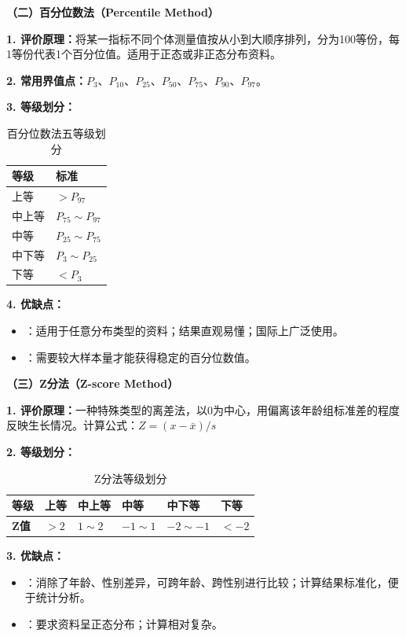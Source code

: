 \begin{keybox}
\textbf{（二）百分位数法（Percentile Method）}

\textbf{1. 评价原理：}将某一指标不同个体测量值按从小到大顺序排列，分为100等份，每1等份代表1个百分位值。适用于正态或非正态分布资料。

\textbf{2. 常用界值点：}$P_3$、$P_{10}$、$P_{25}$、$P_{50}$、$P_{75}$、$P_{90}$、$P_{97}$。

\textbf{3. 等级划分：}

\begin{table}[H]
\centering
\caption{百分位数法五等级划分}
\begin{tabularx}{\textwidth}{ll}
\hline
\textbf{等级} & \textbf{标准} \\
\hline
上等   & $> P_{97}$ \\
中上等 & $P_{75} \sim P_{97}$ \\
中等   & $P_{25} \sim P_{75}$ \\
中下等 & $P_3 \sim P_{25}$ \\
下等   & $< P_3$ \\
\hline
\end{tabularx}
\end{table}

\textbf{4. 优缺点：}

\begin{itemize}[leftmargin=*]
    \item {}：适用于任意分布类型的资料；结果直观易懂；国际上广泛使用。
    \item {}：需要较大样本量才能获得稳定的百分位数值。
\end{itemize}

\textbf{（三）Z分法（Z-score Method）}

\textbf{1. 评价原理：}一种特殊类型的离差法，以0为中心，用偏离该年龄组标准差的程度反映生长情况。计算公式：$Z = (x - \bar{x}) / s$

\textbf{2. 等级划分：}

\begin{table}[H]
\centering
\caption{Z分法等级划分}
\begin{tabularx}{\textwidth}{llllll}
\hline
\textbf{等级} & 上等 & 中上等 & 中等 & 中下等 & 下等 \\
\hline
\textbf{Z值} & $>2$ & $1 \sim 2$ & $-1 \sim 1$ & $-2 \sim -1$ & $<-2$ \\
\hline
\end{tabularx}
\end{table}

\textbf{3. 优缺点：}

\begin{itemize}[leftmargin=*]
    \item {}：消除了年龄、性别差异，可跨年龄、跨性别进行比较；计算结果标准化，便于统计分析。
    \item {}：要求资料呈正态分布；计算相对复杂。
\end{itemize}
\end{keybox}

